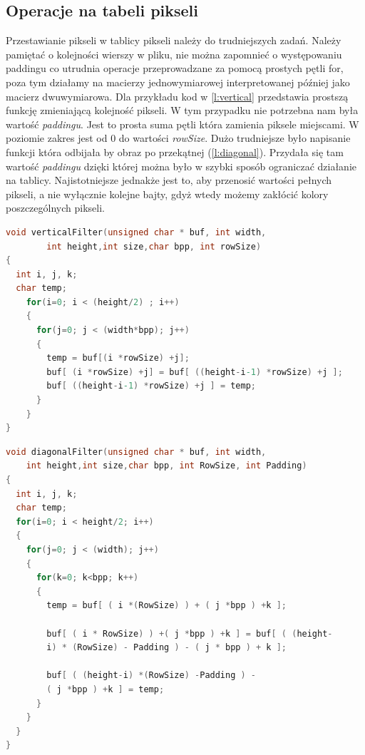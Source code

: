{\subsection{Operacje na tabeli pikseli}
Przestawianie pikseli w tablicy pikseli należy do trudniejszych zadań. Należy pamiętać o kolejności wierszy w pliku, nie można zapomnieć o występowaniu paddingu co utrudnia operacje przeprowadzane za pomocą prostych pętli for, poza tym działamy na macierzy jednowymiarowej interpretowanej później jako macierz dwuwymiarowa. Dla przykładu kod w \ref{l:vertical} przedstawia prostszą funkcję zmieniającą kolejność pikseli. W tym przypadku nie potrzebna nam była wartość \textit{paddingu}. Jest to prosta suma pętli która zamienia piksele miejscami. W poziomie zakres jest od 0 do wartości \textit{rowSize}. Dużo trudniejsze było napisanie funkcji która odbijała by obraz po przekątnej (\ref{l:diagonal}). Przydała się tam wartość \textit{paddingu} dzięki której można było w szybki sposób ograniczać działanie na tablicy.
Najistotniejsze jednakże jest to, aby przenosić wartości pełnych pikseli, a nie wyłącznie kolejne bajty, gdyż wtedy możemy zakłócić kolory poszczególnych pikseli.
\newpage
\begin{lstlisting}[language=C, frame=single, caption=Funkcja odbijająca obraz w pionie , label=l:vertical, basicstyle=\small]  
void verticalFilter(unsigned char * buf, int width,
		int height,int size,char bpp, int rowSize)
{
  int i, j, k;
  char temp;
    for(i=0; i < (height/2) ; i++)
    {
      for(j=0; j < (width*bpp); j++)
      {
        temp = buf[(i *rowSize) +j];
        buf[ (i *rowSize) +j] = buf[ ((height-i-1) *rowSize) +j ];
        buf[ ((height-i-1) *rowSize) +j ] = temp;
      }
    }
}
\end{lstlisting}

\begin{lstlisting}[language=C, frame=single, caption=Funkcja odbijająca obraz po przekątnej , label=l:diagonal, basicstyle=\small]  
void diagonalFilter(unsigned char * buf, int width,
	int height,int size,char bpp, int RowSize, int Padding)
{
  int i, j, k;
  char temp;
  for(i=0; i < height/2; i++)
  {
    for(j=0; j < (width); j++)
    {
      for(k=0; k<bpp; k++)
      {
        temp = buf[ ( i *(RowSize) ) + ( j *bpp ) +k ];
        
        buf[ ( i * RowSize) ) +( j *bpp ) +k ] = buf[ ( (height-
        i) * (RowSize) - Padding ) - ( j * bpp ) + k ];
        
        buf[ ( (height-i) *(RowSize) -Padding ) - 
        ( j *bpp ) +k ] = temp;
      }
    }
  }
}
\end{lstlisting}

}
